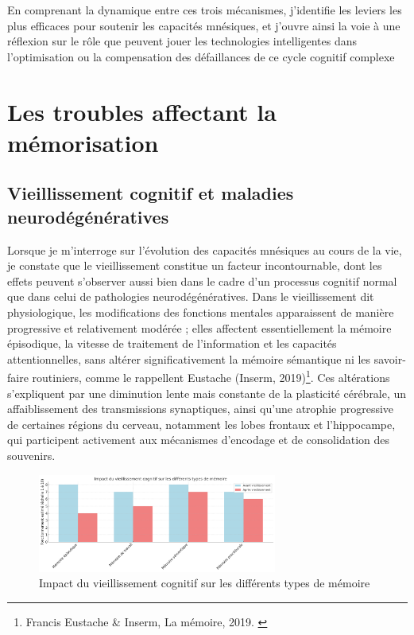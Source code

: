 \documentclass[11pt,a4paper]{report}
\begin{document}
En comprenant la dynamique entre ces trois mécanismes, j’identifie les leviers les plus efficaces pour soutenir les capacités mnésiques, et j’ouvre ainsi la voie à une réflexion sur le rôle que peuvent jouer les technologies intelligentes dans l’optimisation ou la compensation des défaillances de ce cycle cognitif complexe

\section{Les troubles affectant la mémorisation}

\subsection{Vieillissement cognitif et maladies neurodégénératives}

Lorsque je m’interroge sur l’évolution des capacités mnésiques au cours de la vie, je constate que le vieillissement constitue un facteur incontournable, dont les effets peuvent s’observer aussi bien dans le cadre d’un processus cognitif normal que dans celui de pathologies neurodégénératives. Dans le vieillissement dit physiologique, les modifications des fonctions mentales apparaissent de manière progressive et relativement modérée ; elles affectent essentiellement la mémoire épisodique, la vitesse de traitement de l’information et les capacités attentionnelles, sans altérer significativement la mémoire sémantique ni les savoir-faire routiniers, comme le rappellent Eustache (Inserm, 2019)\footnote{Francis Eustache \& Inserm, La mémoire, 2019.  \cite{inserm}}. Ces altérations s’expliquent par une diminution lente mais constante de la plasticité cérébrale, un affaiblissement des transmissions synaptiques, ainsi qu’une atrophie progressive de certaines régions du cerveau, notamment les lobes frontaux et l’hippocampe, qui participent activement aux mécanismes d’encodage et de consolidation des souvenirs.

\begin{figure}[h]
    \centering
    \includegraphics[width=0.7\textwidth]{images/1.2.1.png}
    \caption{Impact du vieillissement cognitif sur les différents types de mémoire}
    \label{fig:1.2.1}
\end{figure}
\end{document}

